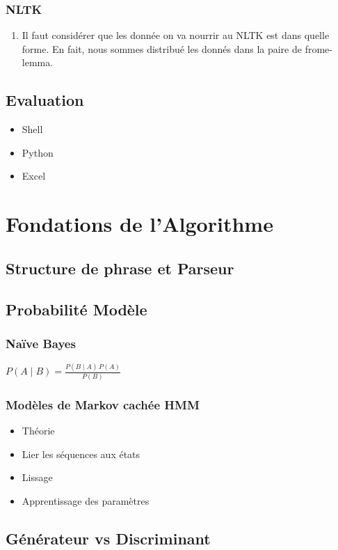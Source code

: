 \documentclass[a4paper]{article}
\begin{document}
\subsubsection{NLTK}
\begin{enumerate}
\item Il faut considérer que les donnée on va nourrir au NLTK est dans quelle forme. En fait, nous sommes distribué les donnés dans la paire de frome-lemma.
\end{enumerate}

\subsection{Evaluation}
\begin{itemize}
\item Shell
\item Python
\item Excel
\end{itemize}

\section{Fondations de l’Algorithme}
\subsection{Structure de phrase et Parseur }
\subsection{Probabilité Modèle}
\subsubsection{Naïve Bayes}
$ P(A \mid B) = \frac{P(B \mid A) \, P(A)}{P(B)} $

\subsubsection{Modèles de Markov cachée HMM}
\begin{itemize}
\item Théorie
\item Lier les séquences aux états
\item Lissage
\item Apprentissage des paramètres
\end{itemize}


\subsection{Générateur vs Discriminant}
\end{document}
